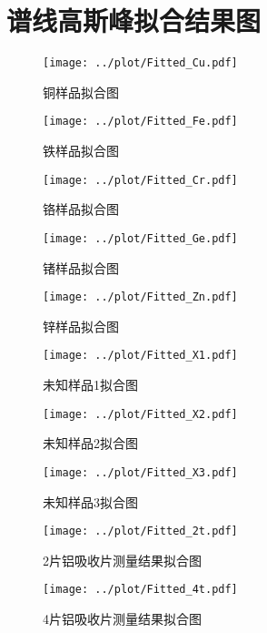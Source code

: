 \documentclass{article}
\begin{document}
    \section{谱线高斯峰拟合结果图}
    \begin{figure}[htbp]
        \centering
        \texttt{[image: ../plot/Fitted\_Cu.pdf]}
        \caption{铜样品拟合图\label{fig:Fitted_Cu}}
    \end{figure}
    \begin{figure}[htbp]
        \centering
        \texttt{[image: ../plot/Fitted\_Fe.pdf]}
        \caption{铁样品拟合图\label{fig:Fitted_Fe}}
    \end{figure}
    \begin{figure}[htbp]
        \centering
        \texttt{[image: ../plot/Fitted\_Cr.pdf]}
        \caption{铬样品拟合图\label{fig:Fitted_Cr}}
    \end{figure}
    \begin{figure}[htbp]
        \centering
        \texttt{[image: ../plot/Fitted\_Ge.pdf]}
        \caption{锗样品拟合图\label{fig:Fitted_Ge}}
    \end{figure}
    \begin{figure}[htbp]
        \centering
        \texttt{[image: ../plot/Fitted\_Zn.pdf]}
        \caption{锌样品拟合图\label{fig:Fitted_Zn}}
    \end{figure}
    \begin{figure}[htbp]
        \centering
        \texttt{[image: ../plot/Fitted\_X1.pdf]}
        \caption{未知样品1拟合图\label{fig:Fitted_X1}}
    \end{figure}
    \begin{figure}[htbp]
        \centering
        \texttt{[image: ../plot/Fitted\_X2.pdf]}
        \caption{未知样品2拟合图\label{fig:Fitted_X2}}
    \end{figure}
    \begin{figure}[htbp]
        \centering
        \texttt{[image: ../plot/Fitted\_X3.pdf]}
        \caption{未知样品3拟合图\label{fig:Fitted_X3}}
    \end{figure}
    \begin{figure}[htbp]
        \centering
        \texttt{[image: ../plot/Fitted\_2t.pdf]}
        \caption{2片铝吸收片测量结果拟合图\label{fig:Fitted_2t}}
    \end{figure}
    \begin{figure}[htbp]
        \centering
        \texttt{[image: ../plot/Fitted\_4t.pdf]}
        \caption{4片铝吸收片测量结果拟合图\label{fig:Fitted_4t}}
    \end{figure}
\end{document}
